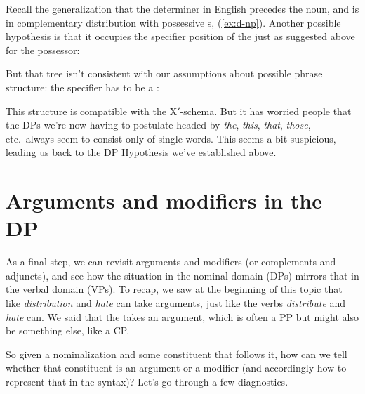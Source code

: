 \documentclass{article}
\begin{document}
Recall the generalization that the determiner in English  precedes the noun, and is in complementary distribution with possessive s, (\ref{ex:d-np}). Another possible hypothesis is that it occupies the specifier position of the  just as suggested above for the possessor:
\begin{exe}
\end{exe}
But that tree isn't consistent with our assumptions about possible phrase structure: the specifier has to be a :
\begin{exe}
\end{exe}
This structure is compatible with the  X$'$-schema.
But it has worried people that the DPs we're now having to postulate headed by \emph{the}, \emph{this}, \emph{that}, \emph{those}, etc.\ always seem to consist only of single words.
This seems a bit suspicious, leading us back to the DP Hypothesis we've established above.


\section{Arguments and modifiers in the DP}
As a final step, we can revisit arguments and modifiers (or complements and adjuncts), and see how the situation in the nominal domain (DPs) mirrors that in the verbal domain (VPs). To recap, we saw at the beginning of this topic that  like \emph{distribution} and \emph{hate} can take arguments, just like the verbs \emph{distribute} and \emph{hate} can. We said that the  takes an argument, which is often a PP but might also be something else, like a CP.

So given a nominalization and some constituent that follows it, how can we tell whether that constituent is an argument or a modifier (and accordingly how to represent that in the syntax)? Let's go through a few diagnostics.
\end{document}
